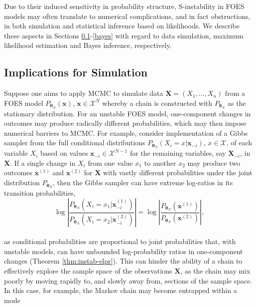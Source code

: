\documentclass[]{article}
\theoremstyle{definition}
\begin{document}
Due to their induced sensitivity in probability structure, S-instability
in FOES models may often translate to numerical complications, and in
fact obstructions, in both simulation and statistical inference based on
likelihoods. We describe these aspects in Sections
\ref{mcmc}-\ref{bayes} with regard to data simulation, maximum
likelihood estimation and Bayes inference, respectively.

\subsection{Implications for Simulation}\label{mcmc}

Suppose one aims to apply MCMC to simulate data
\(\boldsymbol X=(X_1,\ldots,X_n)\) from a FOES model
\(P_{\boldsymbol \theta_N}(\boldsymbol x)\),
\(\boldsymbol x \in\mathcal{X}^N\) whereby a chain is constructed with
\(P_{\boldsymbol \theta_N}\) as the stationary distribution. For an
unstable FOES model, one-component changes in outcomes may produce
radically different probabilities, which may then impose numerical
barriers to MCMC. For example, consider implementation of a Gibbs
sampler from the full conditional distributions
\(P_{\boldsymbol \theta_N} (X_i = x| \boldsymbol x_{-i})\),
\(x\in\mathcal{X}\), of each variable \(X_i\) based on values
\(\boldsymbol x_{-i}\in \mathcal{X}^{N-1}\) for the remaining variables,
say \(\boldsymbol X_{-i}\), in \(\boldsymbol X\). If a single change in
\(X_i\) from one value \(x_1\) to another \(x_2\) may produce two
outcomes \(\boldsymbol x^{(1)}\) and \(\boldsymbol x^{(2)}\) for
\(\boldsymbol X\) with vastly different probabilities under the joint
distribution \(P_{\boldsymbol \theta_N}\), then the Gibbs sampler can
have extreme log-ratios in its transition probabilities, \[
\log \left| \frac{P_{\boldsymbol \theta_N} (X_i =x_1 | \boldsymbol x^{(1)}_{-i})}{P_{\boldsymbol \theta_N} (X_i = x_2| \boldsymbol x^{(2)}_{-i}) } \right|=\log \left| \frac{P_{\boldsymbol \theta_N} ( \boldsymbol x^{(1)} )}{P_{\boldsymbol \theta_N} (  \boldsymbol x^{(2)} ) } \right|,
\]\\
as conditional probabilities are proportional to joint probabilities
that, with unstable models, can have unbounded log-probability ratios in
one-component changes (Theorem \ref{thm:instab-elpr}). This can hinder
the ability of a chain to effectively explore the sample space of the
observations \(\boldsymbol X\), as the chain may mix poorly by moving
rapidly to, and slowly away from, sections of the sample space. In this
case, for example, the Markov chain may become entrapped within a mode
\end{document}
